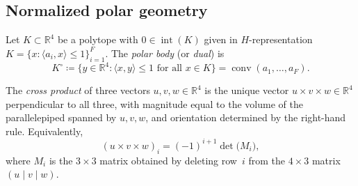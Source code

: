 
\subsection{Normalized polar geometry}

\begin{unverified}
\begin{definition}\label{def:polytope-dual}
Let $K \subset \mathbb{R}^4$ be a polytope with $0 \in \operatorname{int}(K)$
given in $H$-representation $K = \{x : \langle a_i, x\rangle \leq 1\}_{i=1}^F$.
The \emph{polar body} (or \emph{dual}) is
\[
  K^\circ \coloneqq \{y \in \mathbb{R}^4 : \langle x, y \rangle \leq 1
    \text{ for all } x \in K\}
  = \operatorname{conv}(a_1, \ldots, a_F).
\]
\end{definition}
\end{unverified}

\label{def:polar-body}%

\begin{unverified}
\begin{definition}\label{def:cross-product-4d}
The \emph{cross product} of three vectors $u, v, w \in \mathbb{R}^4$
is the unique vector $u \times v \times w \in \mathbb{R}^4$
perpendicular to all three, with magnitude equal to the volume
of the parallelepiped spanned by $u, v, w$, and orientation
determined by the right-hand rule.
Equivalently,
\[
  (u \times v \times w)_i
  = (-1)^{i+1} \det\bigl(M_i\bigr),
\]
where $M_i$ is the $3 \times 3$ matrix obtained by deleting
row~$i$ from the $4 \times 3$ matrix $(u \mid v \mid w)$.
\end{definition}
\end{unverified}

